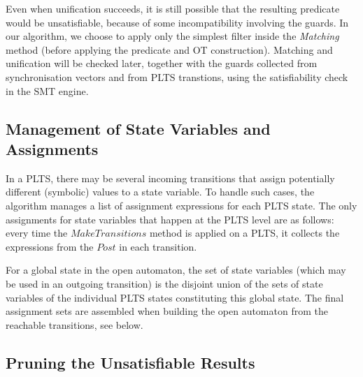 \documentclass[smallcondensed]{svjour3}
\newcommand{\QIN}[1]{\textcolor{airforceblue}{#1}}
\begin{document}
Even when unification succeeds, it is still possible that
the resulting predicate would be unsatisfiable, because of some
incompatibility involving the guards. In our algorithm, we choose to
apply only the simplest filter inside the \emph{Matching} method
(before applying the predicate and OT construction). Matching and
unification  will be checked later, together with the guards collected
from synchronisation vectors and from PLTS transtions, using the
satisfiability check in the SMT engine.


\subsection{Management of State Variables and Assignments}


In a PLTS, there may be several incoming transitions 
that assign potentially different (symbolic) values to a state variable.
To handle such cases, the algorithm manages a
list of assignment expressions for each PLTS state. 
The only assignments for state variables that happen at the PLTS level
are as follows: every time the $MakeTransitions$ method 
 is applied on a PLTS, it collects the expressions from the
$Post$ in each transition. 

For a global state in the open automaton, the set of state
variables (which may be used in an outgoing transition) 
is the disjoint union
of the sets of state variables of the individual PLTS states constituting this
global state. The final assignment sets are assembled when building the
open automaton from the reachable transitions, see below.



\subsection{Pruning the Unsatisfiable Results}
\label{section:pruning}
\end{document}
